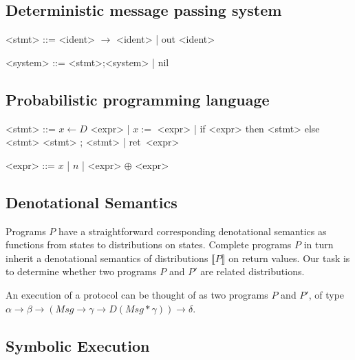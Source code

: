 \documentclass{article}
\newcommand{\eret}{\textsf{ret}\ }
\begin{document}
    \subsection*{Deterministic message passing system}

    \begin{grammar}

        <stmt> ::= <ident> $\to$ <ident> | out <ident> 

        <system> ::= <stmt>;<system> | nil

    \end{grammar}

    \subsection*{Probabilistic programming language}

    \begin{grammar}
        <stmt> ::= $x \leftarrow D$ <expr> | $x := $ <expr> | \textsf{if} <expr> \textsf{then} <stmt> \textsf{else} <stmt> \alt <stmt> ; <stmt> | \eret <expr>

        <expr> ::= $x$ | $n$ | <expr> $\oplus$ <expr>

    \end{grammar}


    \subsection*{Denotational Semantics}

    Programs $P$ have a straightforward corresponding denotational semantics as functions from states to distributions on states. Complete programs $P$ in turn inherit a denotational semantics of distributions $\llbracket P \rrbracket$ on return values. Our task is to determine whether two programs $P$ and $P'$ are related distributions. 
    

    An execution of a protocol can be thought of as two programs $P$ and $P'$, of type $\alpha \rightarrow \beta \rightarrow (\textit{Msg} \rightarrow \gamma \rightarrow D(\textit{Msg} * \gamma)) \rightarrow \delta$.



    \subsection*{Symbolic Execution}
\end{document}
